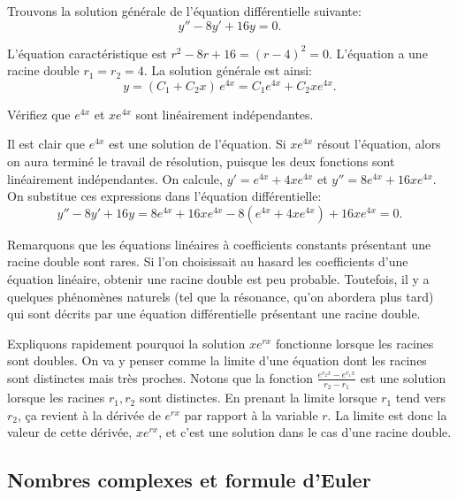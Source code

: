 \begin{example}
Trouvons la solution générale de l'équation différentielle suivante:
\begin{equation*}
y'' -8 y' + 16 y = 0 .
\end{equation*}

L'équation caractéristique est $r^2 - 8 r + 16 = {(r-4)}^2 = 0$.
L'équation a une racine double $r_1 = r_2 = 4$.  La solution générale est ainsi: 
\begin{equation*}
y = (C_1 + C_2 x)\, e^{4 x} = C_1 e^{4x} + C_2 x e^{4x} .
\end{equation*}

\begin{exercise}
Vérifiez que  $e^{4x}$ et $x e^{4x}$ sont linéairement indépendantes. 
\end{exercise}

Il est clair que $e^{4x}$ est une solution de l'équation. Si $x e^{4x}$ résout l'équation, alors on aura terminé le travail de résolution, puisque les deux fonctions sont linéairement indépendantes. On calcule,
$y' = e^{4x} + 4xe^{4x}$ et
$y'' = 8 e^{4x} + 16xe^{4x}$.  On substitue ces expressions dans l'équation différentielle: 
\begin{equation*}
y'' - 8 y' + 16 y = 
8 e^{4x} + 16xe^{4x} - 8(e^{4x} + 4xe^{4x}) + 16 xe^{4x} = 
0 .
\end{equation*}
\end{example}

Remarquons que les équations linéaires à coefficients constants présentant une racine double sont rares. Si l'on choisissait au hasard les coefficients d'une équation linéaire, obtenir une racine double est peu probable. Toutefois, il y a quelques phénomènes naturels (tel que la résonance, qu'on abordera plus tard) qui sont décrits par une équation différentielle présentant une racine double.

Expliquons rapidement pourquoi la solution  $x e^{r x}$ fonctionne lorsque les racines sont doubles. On va y penser comme la limite d'une équation dont les racines sont distinctes mais très proches.  Notons que la fonction  
$\frac{e^{r_2 x} - e^{r_1 x}}{r_2 - r_1}$ est une solution lorsque les racines $r_1,r_2$ sont distinctes. En prenant la limite lorsque  $r_1$ tend vers $r_2$, ça revient à la dérivée de $e^{rx}$ par rapport à la variable $r$.  La limite est donc la valeur de cette dérivée, 
$x e^{rx}$, et c'est une solution dans le cas d'une racine double.

\subsection{Nombres complexes et formule d'Euler}

